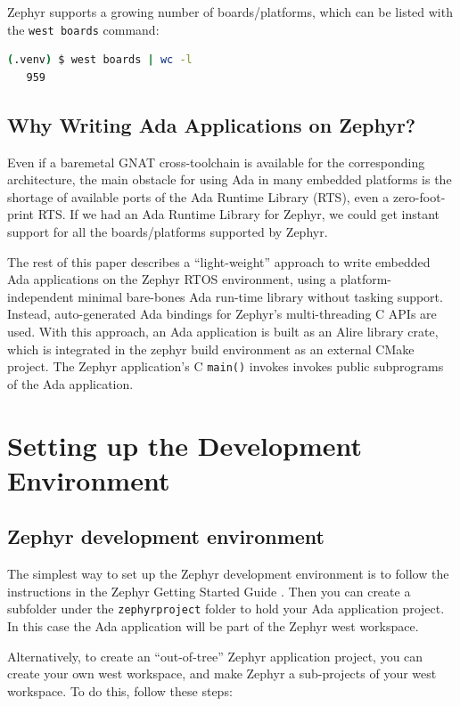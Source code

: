 \documentclass{AUJarticle}
\begin{document}
Zephyr supports a growing number of boards/platforms, which
can be listed with the \verb`west boards` command:

\begin{lstlisting}[language=bash, basicstyle=\ttfamily\scriptsize]
(.venv) $ west boards | wc -l
   959
\end{lstlisting}

\subsection{Why Writing Ada Applications on Zephyr?}
Even if a baremetal GNAT cross-toolchain is available for the corresponding architecture,
the main obstacle for using Ada in many embedded platforms is the shortage of available
ports of the Ada Runtime Library (RTS), even a zero-foot-print RTS.
If we had an Ada Runtime Library for Zephyr, we could get instant support for all the
boards/platforms supported by Zephyr.

The rest of this paper describes a ``light-weight'' approach to write embedded
Ada applications on the Zephyr RTOS environment, using a platform-independent minimal
bare-bones Ada run-time library without tasking support. Instead, auto-generated Ada
bindings for Zephyr's multi-threading C APIs are used. With this approach, an Ada
application is built as an Alire \cite{Alire} library crate, which is integrated in
the zephyr build environment as an external CMake project. The Zephyr application's
C \verb`main()` invokes invokes public subprograms of the Ada application.

\section{Setting up the Development Environment}

\subsection{Zephyr development environment}

The simplest way to set up the Zephyr development environment is to follow the
instructions in the Zephyr Getting Started Guide \cite{Zephyr2}. Then you can create
a subfolder under the \verb`zephyrproject` folder to hold your Ada application project.
In this case the Ada application will be part of the Zephyr west workspace.

Alternatively, to create an ``out-of-tree'' Zephyr application project, you
can create your own west workspace, and make Zephyr a sub-projects of your
west workspace. To do this, follow these steps:
\end{document}
